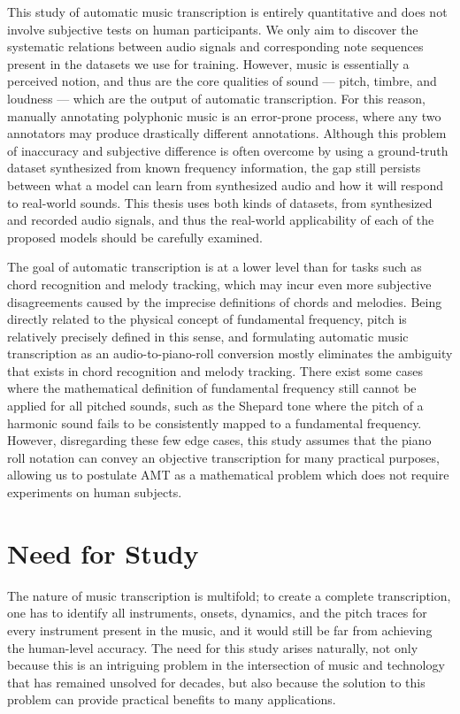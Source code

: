 This study of automatic music transcription is entirely quantitative and does not involve subjective tests on human participants.
We only aim to discover the systematic relations between audio signals and corresponding note sequences present in the datasets we use for training.
However, music is essentially a perceived notion, and thus are the core qualities of sound --- pitch, timbre, and loudness --- which are the output of automatic transcription.
For this reason, manually annotating polyphonic music is an error-prone process, where any two annotators may produce drastically different annotations.
Although this problem of inaccuracy and subjective difference is often overcome by using a ground-truth dataset synthesized from known frequency information, the gap still persists between what a model can learn from synthesized audio and how it will respond to real-world sounds.
This thesis uses both kinds of datasets, from synthesized and recorded audio signals, and thus the real-world applicability of each of the proposed models should be carefully examined.

The goal of automatic transcription is at a lower level than for tasks such as  chord recognition and melody tracking, which may incur even more subjective disagreements caused by the imprecise definitions of chords and melodies.
Being directly related to the physical concept of fundamental frequency, pitch is relatively precisely defined in this sense, and formulating automatic music transcription as an audio-to-piano-roll conversion mostly eliminates the ambiguity that exists in chord recognition and melody tracking.
There exist some cases where the mathematical definition of fundamental frequency still cannot be applied for all pitched sounds, such as the Shepard tone \cite{shepard1964circularity} where the pitch of a harmonic sound fails to be consistently mapped to a fundamental frequency.
However, disregarding these few edge cases, this study assumes that the piano roll notation can convey an objective transcription for many practical purposes, allowing us to postulate AMT as a mathematical problem which does not require experiments on human subjects.

\section{Need for Study}

The nature of music transcription is multifold; to create a complete transcription, one has to identify all instruments, onsets, dynamics, and the pitch traces for every instrument present in the music, and it would still be far from achieving the human-level accuracy.
The need for this study arises naturally, not only because this is an intriguing problem in the intersection of music and technology that has remained unsolved for decades, but also because the solution to this problem can provide practical benefits to many applications.

